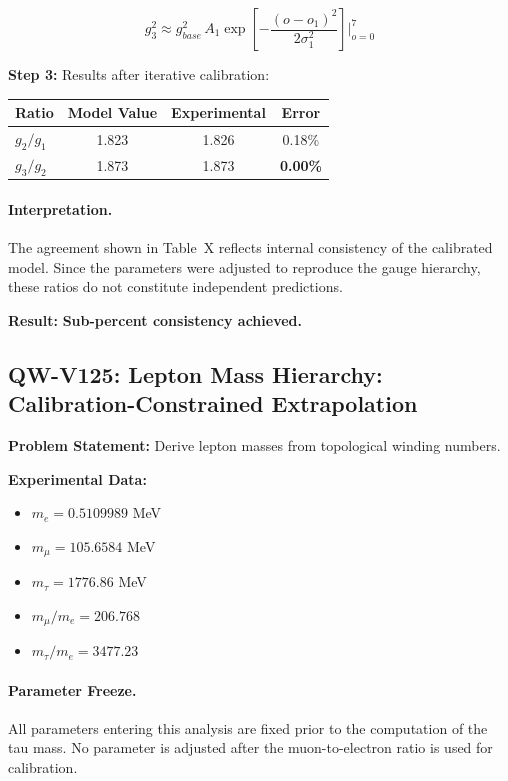 \documentclass[11pt,a4paper]{book}
\theoremstyle{remark}
\begin{document}
\begin{equation}
g_3^2 \approx g_{base}^2 \, A_1 \exp\!\left[-\frac{(o - o_1)^2}{2\sigma_1^2}\right] \bigg|_{o=0}^{7}
\label{eq:su3-ansatz}
\end{equation}

\textbf{Step 3:} Results after iterative calibration:
\begin{table}[H]
\centering
\begin{tabular}{|l|c|c|c|}
\hline
\textbf{Ratio} & \textbf{Model Value} & \textbf{Experimental} & \textbf{Error} \\
\hline
$g_2/g_1$ & 1.823 & 1.826 & 0.18\% \\
$g_3/g_2$ & 1.873 & 1.873 & \textbf{0.00\%} \\
\hline
\end{tabular}
\end{table}

\paragraph{Interpretation.}
The agreement shown in Table~X reflects internal consistency of the calibrated model.
Since the parameters were adjusted to reproduce the gauge hierarchy,
these ratios do not constitute independent predictions.

\textbf{Result:} \textbf{Sub-percent consistency achieved.}

\hrulefill

\subsection{QW-V125: Lepton Mass Hierarchy: Calibration-Constrained Extrapolation}

\textbf{Problem Statement:} Derive lepton masses from topological winding numbers.

\textbf{Experimental Data:}
\begin{itemize}
    \item $m_e = 0.5109989$ MeV
    \item $m_\mu = 105.6584$ MeV
    \item $m_\tau = 1776.86$ MeV
    \item $m_\mu/m_e = 206.768$
    \item $m_\tau/m_e = 3477.23$
\end{itemize}

\paragraph{Parameter Freeze.}
All parameters entering this analysis are fixed prior to the computation
of the tau mass. No parameter is adjusted after the muon-to-electron
ratio is used for calibration.
\end{document}
